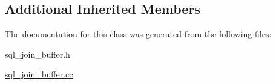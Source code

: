 \subsection*{Additional Inherited Members}


The documentation for this class was generated from the following files\+:\begin{DoxyCompactItemize}
\item 
sql\+\_\+join\+\_\+buffer.\+h\item 
\mbox{\hyperlink{sql__join__buffer_8cc}{sql\+\_\+join\+\_\+buffer.\+cc}}\end{DoxyCompactItemize}
